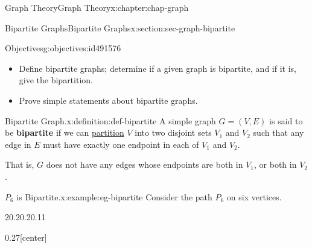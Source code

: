 \documentclass[oneside,10pt,]{book}
\newcommand{\terminology}[1]{\textbf{#1}}
\numberwithin{equation}{section}
\begin{document}
\begin{chapterptx}{Graph Theory}{}{Graph Theory}{}{}{x:chapter:chap-graph}
%
\begin{sectionptx}{Bipartite Graphs}{}{Bipartite Graphs}{}{}{x:section:sec-graph-bipartite}
\begin{objectives}{Objectives}{g:objectives:id491576}
%
\begin{itemize}[label=\textbullet]
\item{}Define bipartite graphs; determine if a given graph is bipartite, and if it is, give the bipartition.%
\item{}Prove simple statements about bipartite graphs.%
\end{itemize}
\end{objectives}
\begin{definition}{Bipartite Graph.}{x:definition:def-bipartite}%
A simple graph \(G = (V,E)\) is said to be \terminology{bipartite} if we can \hyperref[x:definition:def-partition]{partition} \(V\) into two disjoint sets \(V_1\) and \(V_2\) such that any edge in \(E\) must have exactly one endpoint in each of \(V_1\) and \(V_2\).%
\par
That is, \(G\) does not have any edges whose endpoints are both in \(V_1\), or both in \(V_2\).%
\end{definition}
\begin{example}{\(P_6\) is Bipartite.}{x:example:eg-bipartite}%
Consider the path \(P_6\) on six vertices.%
\begin{sidebyside}{2}{0.2}{0.2}{0.11}%
\begin{sbspanel}{0.27}[center]%
\end{sbspanel}
\end{sidebyside}
\end{example}
\end{sectionptx}
\end{chapterptx}
\end{document}
